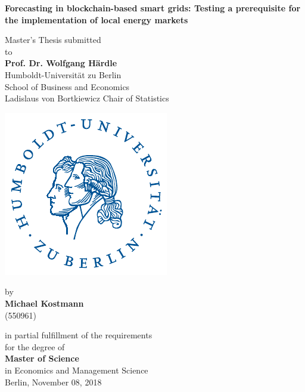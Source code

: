 \begin{center}
\vspace*{0.5cm}

    {\Large{\bf Forecasting in blockchain-based smart grids: Testing a prerequisite for the implementation of local energy markets}} \vspace{1cm}


    {\normalsize Master's Thesis submitted\\\vspace{0.5cm}
    to}\\\vspace{0.5cm}
    {\normalsize{\bf Prof. Dr. Wolfgang H\"ardle}} \\\vspace{0.5cm}
    {\normalsize Humboldt-Universit\"at zu Berlin \\
    School of Business and Economics \\
    Ladislaus von Bortkiewicz Chair of Statistics} \vspace{1cm}
    
    \includegraphics[]{thesis/figures/logo.pdf}
    \vspace{1cm}

    {\normalsize by \\\vspace{0.5cm}
    {\bf Michael Kostmann} \\
    (550961)} \vspace{1cm}


    {\normalsize in partial fulfillment of the requirements \\
    for the degree of \\
    {\bf Master of Science} \\
    in Economics and Management Science \\\vspace{1cm}
    Berlin, November 08,  2018}

\end{center}
